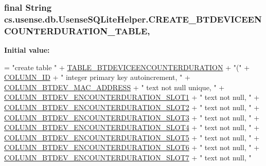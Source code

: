 \subsubsection[{C\+R\+E\+A\+T\+E\+\_\+\+B\+T\+D\+E\+V\+I\+C\+E\+E\+N\+C\+O\+U\+N\+T\+E\+R\+D\+U\+R\+A\+T\+I\+O\+N\+\_\+\+T\+A\+B\+L\+E}]{\setlength{\rightskip}{0pt plus 5cm}final String cs.\+usense.\+db.\+Usense\+S\+Q\+Lite\+Helper.\+C\+R\+E\+A\+T\+E\+\_\+\+B\+T\+D\+E\+V\+I\+C\+E\+E\+N\+C\+O\+U\+N\+T\+E\+R\+D\+U\+R\+A\+T\+I\+O\+N\+\_\+\+T\+A\+B\+L\+E\hspace{0.3cm}{\ttfamily [static]}, {\ttfamily [private]}}\label{classcs_1_1usense_1_1db_1_1_usense_s_q_lite_helper_a865eeed8f2e7fe4b1a58faabb345d96d}
{\bfseries Initial value\+:}
\begin{DoxyCode}
= \textcolor{stringliteral}{"create table "}
            + \hyperlink{classcs_1_1usense_1_1db_1_1_usense_s_q_lite_helper_a97c1a24a98e051f656761705264f03d6}{TABLE\_BTDEVICEENCOUNTERDURATION} + \textcolor{stringliteral}{"("}
            + \hyperlink{classcs_1_1usense_1_1db_1_1_usense_s_q_lite_helper_ac0c4ad3a273f5adda9bdfc60e679379d}{COLUMN\_ID} + \textcolor{stringliteral}{" integer primary key autoincrement, "}
            + \hyperlink{classcs_1_1usense_1_1db_1_1_usense_s_q_lite_helper_a88746e54f676544fb8a10c6e2fd5843b}{COLUMN\_BTDEV\_MAC\_ADDRESS} + \textcolor{stringliteral}{" text not null unique, "}
            + \hyperlink{classcs_1_1usense_1_1db_1_1_usense_s_q_lite_helper_ad8820f02a90e03ca9cf51e534b313511}{COLUMN\_BTDEV\_ENCOUNTERDURATION\_SLOT1} + \textcolor{stringliteral}{" text not null, "}
            + \hyperlink{classcs_1_1usense_1_1db_1_1_usense_s_q_lite_helper_a45928db8e7e417e578a8153081d460ea}{COLUMN\_BTDEV\_ENCOUNTERDURATION\_SLOT2} + \textcolor{stringliteral}{" text not null, "}
            + \hyperlink{classcs_1_1usense_1_1db_1_1_usense_s_q_lite_helper_af81dd682aec6dd31cf4bd7fac96d9307}{COLUMN\_BTDEV\_ENCOUNTERDURATION\_SLOT3} + \textcolor{stringliteral}{" text not null, "}
            + \hyperlink{classcs_1_1usense_1_1db_1_1_usense_s_q_lite_helper_a6b03315682cd23d39c29eb1214384c0c}{COLUMN\_BTDEV\_ENCOUNTERDURATION\_SLOT4} + \textcolor{stringliteral}{" text not null, "}
            + \hyperlink{classcs_1_1usense_1_1db_1_1_usense_s_q_lite_helper_a357bdf6b263b3154c55d25d90461cda4}{COLUMN\_BTDEV\_ENCOUNTERDURATION\_SLOT5} + \textcolor{stringliteral}{" text not null, "}
            + \hyperlink{classcs_1_1usense_1_1db_1_1_usense_s_q_lite_helper_addeb176681ab91528123d9510c12139f}{COLUMN\_BTDEV\_ENCOUNTERDURATION\_SLOT6} + \textcolor{stringliteral}{" text not null, "}
            + \hyperlink{classcs_1_1usense_1_1db_1_1_usense_s_q_lite_helper_ac3bc35d0f54bed38b8f3da6d860124a7}{COLUMN\_BTDEV\_ENCOUNTERDURATION\_SLOT7} + \textcolor{stringliteral}{" text not null, "}

\end{DoxyCode}
